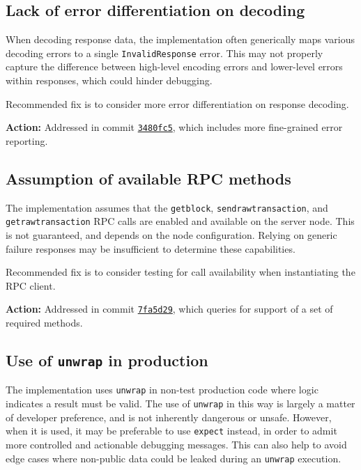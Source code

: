 \documentclass{article}
\begin{document}
\subsection{Lack of error differentiation on decoding}

When decoding response data, the implementation often generically maps various decoding errors to a single \texttt{InvalidResponse} error.
This may not properly capture the difference between high-level encoding errors and lower-level errors within responses, which could hinder debugging.

Recommended fix is to consider more error differentiation on response decoding.

\textbf{Action:} Addressed in commit \href{https://github.com/serai-dex/serai/commit/3480fc5e166d5d4c2b7cfcbfe086534997857770}{\texttt{3480fc5}}, which includes more fine-grained error reporting.


\subsection{Assumption of available RPC methods}

The implementation assumes that the \texttt{getblock}, \texttt{sendrawtransaction}, and \texttt{getrawtransaction} RPC calls are enabled and available on the server node.
This is not guaranteed, and depends on the node configuration.
Relying on generic failure responses may be insufficient to determine these capabilities.

Recommended fix is to consider testing for call availability when instantiating the RPC client.

\textbf{Action:} Addressed in commit \href{https://github.com/serai-dex/serai/commit/7fa5d291b8c60da1c26525b45f02610180bc90c8}{\texttt{7fa5d29}}, which queries for support of a set of required methods.


\subsection{Use of \texttt{unwrap} in production}

The implementation uses \texttt{unwrap} in non-test production code where logic indicates a result must be valid.
The use of \texttt{unwrap} in this way is largely a matter of developer preference, and is not inherently dangerous or unsafe.
However, when it is used, it may be preferable to use \texttt{expect} instead, in order to admit more controlled and actionable debugging messages.
This can also help to avoid edge cases where non-public data could be leaked during an \texttt{unwrap} execution.
\end{document}

